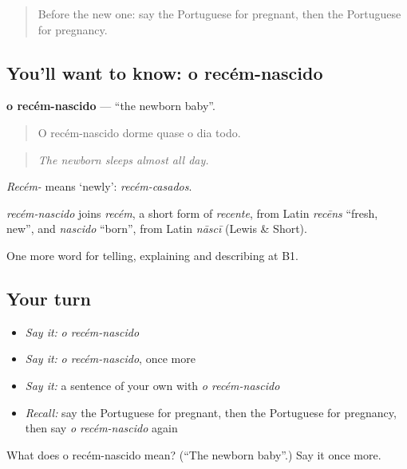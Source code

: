 \label{lesson:PT-C309-recem-nascido}



\begin{quote}
Before the new one: say the Portuguese for pregnant, then the Portuguese for pregnancy.
\end{quote}

\subsection*{You'll want to know: o recém-nascido}
\textbf{o recém-nascido} — \textquotedblleft{}the newborn baby\textquotedblright{}.

\begin{quote}
O recém-nascido dorme quase o dia todo.
\end{quote}

\begin{quote}
\emph{The newborn sleeps almost all day.}
\end{quote}

\emph{Recém-} means ‘newly’: \emph{recém-casados}.

\begin{cousinweb}
\emph{recém-nascido} joins \emph{recém}, a short form of \emph{recente}, from Latin \emph{recēns} \textquotedblleft{}fresh, new\textquotedblright{}, and \emph{nascido} \textquotedblleft{}born\textquotedblright{}, from Latin \emph{nāscī} (Lewis \& Short).
\end{cousinweb}

\begin{grammarlens}[title={What you've built}]
One more word for telling, explaining and describing at B1.
\end{grammarlens}

\subsection*{Your turn}
\begin{itemize}
\raggedright
  \item \emph{Say it:} \emph{o recém-nascido}
  \item \emph{Say it:} \emph{o recém-nascido}, once more
  \item \emph{Say it:} a sentence of your own with \emph{o recém-nascido}
  \item \emph{Recall:} say the Portuguese for pregnant, then the Portuguese for pregnancy, then say \emph{o recém-nascido} again
\end{itemize}

\begin{tcolorbox}[breakable,colback=teal!4,colframe=teal!35!black,title={Before you move on}]
What does o recém-nascido mean? (\textquotedblleft{}The newborn baby\textquotedblright{}.) Say it once more.
\end{tcolorbox}
